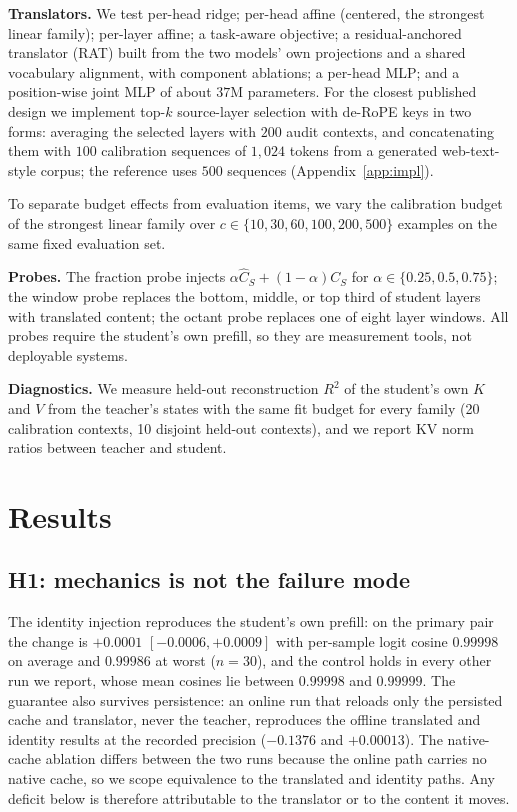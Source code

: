 \documentclass[10pt]{article}
\newcommand{\kv}{\ensuremath{\mathrm{KV}}}
\begin{document}
\textbf{Translators.} We test per-head ridge; per-head affine (centered, the
strongest linear family); per-layer affine; a task-aware objective; a
residual-anchored translator (RAT) built from the two
models' own projections and a shared vocabulary alignment, with component
ablations; a per-head MLP; and a position-wise joint MLP of about $37$M
parameters. For the closest published design we implement top-$k$ source-layer
selection with de-RoPE keys \citep{heo2026} in two forms: averaging the selected
layers with $200$ audit contexts, and concatenating them with $100$ calibration
sequences of $1{,}024$ tokens from a generated web-text-style corpus; the
reference uses $500$ sequences (Appendix~\ref{app:impl}).

To separate budget effects from evaluation items, we vary the calibration budget
of the strongest linear family over $c\in\{10,30,60,100,200,500\}$ examples on
the same fixed evaluation set.

\textbf{Probes.} The fraction probe injects
$\alpha\widehat C_S+(1-\alpha)C_S$ for $\alpha\in\{0.25,0.5,0.75\}$; the window
probe replaces the bottom, middle, or top third of student layers with
translated content; the octant probe replaces one of eight layer windows. All
probes require the student's own prefill, so they are measurement tools,
not deployable systems.

\textbf{Diagnostics.} We measure held-out reconstruction $R^2$ of the student's
own $K$ and $V$ from the teacher's states with the same fit budget for every
family (20 calibration contexts, 10 disjoint held-out contexts), and we report
\kv{} norm ratios between teacher and student.


\section{Results}
\label{sec:results}

\subsection{H1: mechanics is not the failure mode}
\label{sec:h1}
The identity injection reproduces the student's own prefill: on the primary pair
the change is $+0.0001$ $[-0.0006,+0.0009]$ with per-sample logit cosine $0.99998$
on average and $0.99986$ at worst ($n{=}30$), and the control holds in every
other run we report, whose mean cosines lie between $0.99998$ and $0.99999$.
The guarantee also survives persistence: an online run that
reloads only the persisted cache and translator, never the teacher, reproduces the
offline translated and identity results at the recorded precision ($-0.1376$ and
$+0.00013$). The native-cache ablation differs between the two runs because the
online path carries no native cache, so we scope equivalence to the translated
and identity paths. Any deficit below is therefore attributable to the translator or to
the content it moves.
\end{document}
